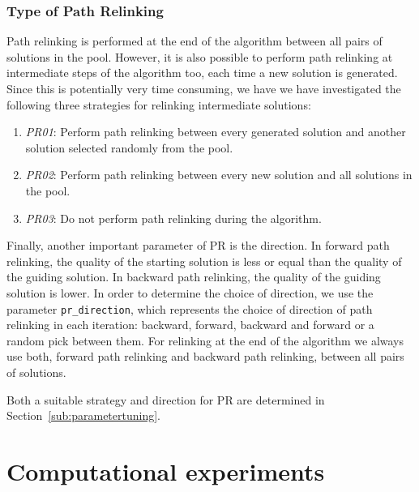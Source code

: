 \documentclass[a4paper,11pt,authoryear]{elsarticle}
\begin{document}
\subsubsection{Type of Path Relinking}
\label{subsub:typepathrelinking}
\noindent Path relinking is performed at the end of the algorithm between all pairs of solutions in the pool. However, it is also possible to perform path relinking at intermediate steps of the algorithm too, each time a new solution is generated. Since this is potentially very time consuming, we have we have investigated the following three strategies for relinking intermediate solutions:
\begin{enumerate}[label={(\arabic*)}]
    \item \textit{PR01}: Perform path relinking between every generated solution and another solution selected randomly from the pool.
    \item \textit{PR02}: Perform path relinking between every new solution and all solutions in the pool.
    \item \textit{PR03}: Do not perform path relinking during the algorithm.
\end{enumerate}

\noindent Finally, another important parameter of PR is the direction. In forward path relinking, the quality of the starting solution is less or equal than the quality of the guiding solution. In backward path relinking, the quality of the guiding solution is lower. In order to determine the choice of direction, we use the parameter \texttt{pr\_direction}, which represents the choice of direction of path relinking in each iteration: backward, forward, backward and forward or a random pick between them. For relinking at the end of the algorithm we always use both, forward path relinking and backward path relinking, between all pairs of solutions.

Both a suitable strategy and direction for PR are determined in Section~\ref{sub:parametertuning}.

\section{Computational experiments}
\label{sec:computationalexperiments}

\end{document}
